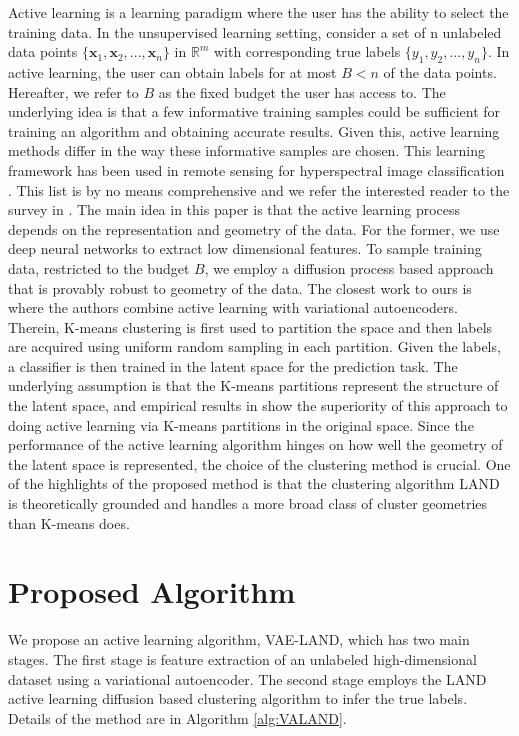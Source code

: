 \documentclass{article}
\def\x{{\mathbf x}}
\begin{document}
Active learning is a learning paradigm where the user has the ability to select the training data\cite{cohn1995active,mackay1992information}. In the unsupervised learning setting, consider a set of n unlabeled data points $\{\x_1,\x_2,...,\x_n\}$ in $\mathbb{R}^{m}$ with corresponding true labels $\{y_1,y_2,...,y_n\}$. In active learning, the user can obtain labels for at most $B<n$ of the data points. Hereafter, we refer to $B$ as the fixed budget the user has access to. The underlying idea is that a few informative training samples could be sufficient for training an algorithm and obtaining accurate results. Given this, active learning methods differ in the way these informative samples are chosen. This learning framework has been used in remote sensing for hyperspectral image classification \cite{liu2016active,wang2017novel,murphy2018iterative,tuia2009active}.  This list is by no means comprehensive and we refer the interested reader to the survey in \cite{tuia2011survey}. 
The main idea in this paper is that the active learning process depends on the representation and geometry of the data. For the former, we use deep neural networks to extract low
dimensional features. To sample training data, restricted to the budget $B$, we employ a diffusion process based approach that is provably robust to geometry of the data. 
 The closest work to ours is  \cite{pourkamali2019effectiveness} where the authors combine active learning with variational autoencoders. Therein, K-means clustering is first used to partition the space and then labels are acquired using uniform random sampling in each partition. Given the labels, a classifier is then trained in the latent space for the prediction task. The underlying assumption is that the K-means partitions represent the structure of the latent space, and empirical results in \cite{pourkamali2019effectiveness} show the superiority of this approach to doing active learning via K-means partitions in the original space. Since the performance of the active learning algorithm hinges on how well the geometry of the latent space is represented, the choice of the clustering method is crucial. One of the highlights of the proposed method is that the clustering algorithm LAND is theoretically grounded and handles a more broad class of cluster geometries than K-means does.







\section{Proposed Algorithm}
\label{sec:ProposedAlgorithm}
We propose an active learning algorithm, VAE-LAND, which has two main stages. The first stage is feature extraction of an unlabeled high-dimensional dataset using a variational autoencoder. The second stage employs the LAND active learning diffusion based clustering algorithm to infer the true labels. Details of the method are in Algorithm \ref{alg:VALAND}.
\end{document}
